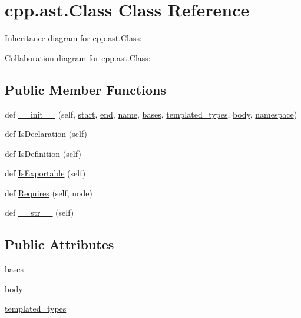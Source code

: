 \hypertarget{classcpp_1_1ast_1_1_class}{}\section{cpp.\+ast.\+Class Class Reference}
\label{classcpp_1_1ast_1_1_class}


Inheritance diagram for cpp.\+ast.\+Class\+:


Collaboration diagram for cpp.\+ast.\+Class\+:
\subsection*{Public Member Functions}
\begin{DoxyCompactItemize}
\item 
def \hyperlink{classcpp_1_1ast_1_1_class_acc17c34512d5cc54d5125734ce79f219}{\+\_\+\+\_\+init\+\_\+\+\_\+} (self, \hyperlink{classcpp_1_1ast_1_1_node_a7b2aa97e6a049bb1a93aea48c48f1f44}{start}, \hyperlink{classcpp_1_1ast_1_1_node_a3c5e5246ccf619df28eca02e29d69647}{end}, \hyperlink{classcpp_1_1ast_1_1___generic_declaration_af774f4729dfd78d0538a6782fe8514c1}{name}, \hyperlink{classcpp_1_1ast_1_1_class_a5665eb67314a075d4e0ff91accbde5d1}{bases}, \hyperlink{classcpp_1_1ast_1_1_class_a48ed0d3115656554d9134bc1787390fa}{templated\+\_\+types}, \hyperlink{classcpp_1_1ast_1_1_class_add39f61fdcf6dae42d79cac3dcbb7782}{body}, \hyperlink{classcpp_1_1ast_1_1___generic_declaration_a8aee3f11b37449d54b42a78e0a689f46}{namespace})
\item 
def \hyperlink{classcpp_1_1ast_1_1_class_a4758bfb7c00410575932974e1ed8b7da}{Is\+Declaration} (self)
\item 
def \hyperlink{classcpp_1_1ast_1_1_class_ae6d2356f835d06d5109d9e4609d86780}{Is\+Definition} (self)
\item 
def \hyperlink{classcpp_1_1ast_1_1_class_a1ab749f8cfddb0903c6484791f70f42e}{Is\+Exportable} (self)
\item 
def \hyperlink{classcpp_1_1ast_1_1_class_a347673e0a2a7b840b7d2d1cae13977f7}{Requires} (self, node)
\item 
def \hyperlink{classcpp_1_1ast_1_1_class_a0a63f6fab75d61ffac6fb9f1c29ae84d}{\+\_\+\+\_\+str\+\_\+\+\_\+} (self)
\end{DoxyCompactItemize}
\subsection*{Public Attributes}
\begin{DoxyCompactItemize}
\item 
\hyperlink{classcpp_1_1ast_1_1_class_a5665eb67314a075d4e0ff91accbde5d1}{bases}
\item 
\hyperlink{classcpp_1_1ast_1_1_class_add39f61fdcf6dae42d79cac3dcbb7782}{body}
\item 
\hyperlink{classcpp_1_1ast_1_1_class_a48ed0d3115656554d9134bc1787390fa}{templated\+\_\+types}
\end{DoxyCompactItemize}


